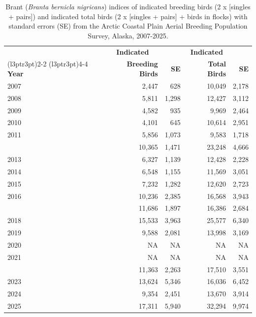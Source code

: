 \documentclass[
]{article}
\begin{document}
\begin{longtable}[t]{lrrrr}

\caption{\label{tbl-BRAN}Brant (\emph{Branta bernicla nigricans})
indices of indicated breeding birds (2 x {[}singles + pairs{]}) and
indicated total birds (2 x {[}singles + pairs{]} + birds in flocks) with
standard errors (SE) from the Arctic Coastal Plain Aerial Breeding
Population Survey, Alaska, 2007-2025.}

\tabularnewline

\\
\toprule
\multicolumn{1}{c}{\textbf{ }} & \multicolumn{1}{c}{\textbf{Indicated}} & \multicolumn{1}{c}{\textbf{ }} & \multicolumn{1}{c}{\textbf{Indicated}} & \multicolumn{1}{c}{\textbf{ }} \\
\cmidrule(l{3pt}r{3pt}){2-2} \cmidrule(l{3pt}r{3pt}){4-4}
\textbf{Year} & \textbf{Breeding Birds} & \textbf{SE} & \textbf{Total Birds} & \textbf{SE}\\
\midrule
2007 & 2,447 & 628 & 10,049 & 2,178\\
2008 & 5,811 & 1,298 & 12,427 & 3,112\\
2009 & 4,582 & 935 & 9,969 & 2,464\\
2010 & 4,101 & 645 & 10,614 & 2,951\\
2011 & 5,856 & 1,073 & 9,583 & 1,718\\
\addlinespace
2012 & 10,365 & 1,471 & 23,248 & 4,666\\
2013 & 6,327 & 1,139 & 12,428 & 2,228\\
2014 & 6,548 & 1,155 & 11,569 & 3,051\\
2015 & 7,232 & 1,282 & 12,620 & 2,723\\
2016 & 10,236 & 2,385 & 16,568 & 3,943\\
\addlinespace
2017 & 11,686 & 1,897 & 16,386 & 2,684\\
2018 & 15,533 & 3,963 & 25,577 & 6,340\\
2019 & 9,588 & 2,081 & 13,998 & 3,169\\
2020 & NA & NA & NA & NA\\
2021 & NA & NA & NA & NA\\
\addlinespace
2022 & 11,363 & 2,263 & 17,510 & 3,551\\
2023 & 13,624 & 5,346 & 16,036 & 6,452\\
2024 & 9,354 & 2,451 & 13,670 & 3,914\\
2025 & 17,311 & 5,940 & 32,294 & 9,974\\
\bottomrule

\end{longtable}
\end{document}
